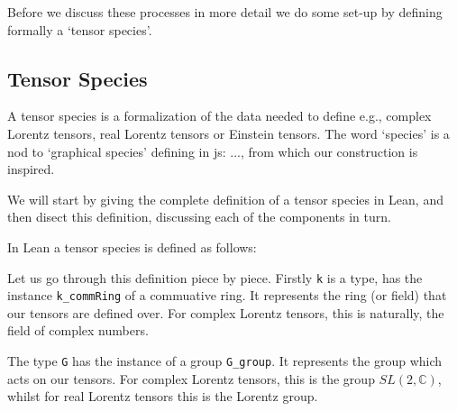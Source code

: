 \documentclass[a4paper, 11pt]{article}
\newcommand{\js}[1]{ {\color{magenta} js:  #1}}
\begin{document}
Before we discuss these processes in more detail we do some set-up by defining formally a 
`tensor species'. 

\subsection{Tensor Species}

A tensor species is a formalization of the data needed to define e.g., complex Lorentz tensors, 
real Lorentz tensors or Einstein tensors. The word `species' is a nod to `graphical species'
defining in \js{...}, from which our construction is inspired.

We will start by giving the complete definition of a tensor species in Lean, and then 
disect this definition, discussing each of the components in turn. 

In Lean a tensor species is defined as follows:
\begin{code}

\end{code}

Let us go through this definition piece by piece.
Firstly \lstinline|k| is a type, has the instance \lstinline|k_commRing| of a commuative ring. 
It represents the ring (or field) that our tensors are defined over. For complex Lorentz tensors, 
this is naturally, the field of complex numbers. 

The type \lstinline|G| has the instance of a group \lstinline|G_group|. It represents 
the group which acts on our tensors. For complex Lorentz tensors, this is the group 
$SL(2, \mathbb{C})$, whilst for real Lorentz tensors this is the Lorentz group. 
\end{document}
